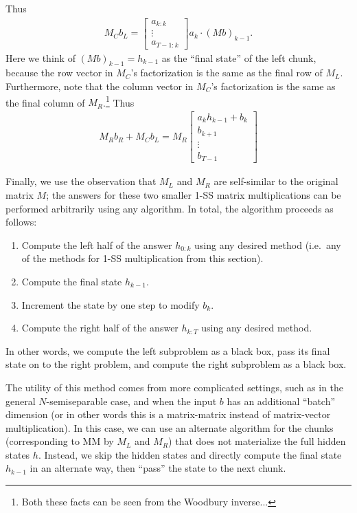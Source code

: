 Thus
\begin{align*}%
  M_C b_L =
  \begin{bmatrix} a_{k:k} \\ \vdots \\ a_{T-1:k} \end{bmatrix}
  a_k
  \cdot
  (Mb)_{k-1}
  .
\end{align*}
Here we think of $(Mb)_{k-1} = h_{k-1}$ as the ``final state'' of the left chunk,
because the row vector in $M_C$'s factorization is the same as the final row of $M_L$.
Furthermore, note that the column vector in $M_C$'s factorization is the same as the final column of $M_R$.\footnote{Both these facts can be seen from the Woodbury inverse...}
Thus
\begin{align*}%
  M_R b_R + M_C b_L =
  M_R
  \begin{bmatrix} a_k h_{k-1} + b_k \\ b_{k+1} \\ \vdots \\ b_{T-1} \end{bmatrix}
\end{align*}

Finally, we use the observation that $M_L$ and $M_R$ are self-similar to the original matrix $M$; the answers for these two smaller 1-SS matrix multiplications can be performed arbitrarily using any algorithm.
In total, the algorithm proceeds as follows:
\begin{enumerate}
  \item Compute the left half of the answer $h_{0:k}$ using any desired method (i.e.\ any of the methods for 1-SS multiplication from this section).
  \item Compute the final state $h_{k-1}$. %
  \item Increment the state by one step to modify $b_{k}$.
  \item Compute the right half of the answer $h_{k:T}$ using any desired method.
\end{enumerate}
%

In other words, we compute the left subproblem as a black box, pass its final state on to the right problem, and compute the right subproblem as a black box.

The utility of this method comes from more complicated settings, such as in the general $N$-semiseparable case,
and when the input $b$ has an additional ``batch'' dimension (or in other words this is a matrix-matrix instead of matrix-vector multiplication).
In this case, we can use an alternate algorithm for the chunks (corresponding to MM by $M_L$ and $M_R$) that does not materialize the full hidden states $h$.
Instead, we skip the hidden states and directly compute the final state $h_{k-1}$ in an alternate way, then ``pass'' the state to the next chunk.
%



